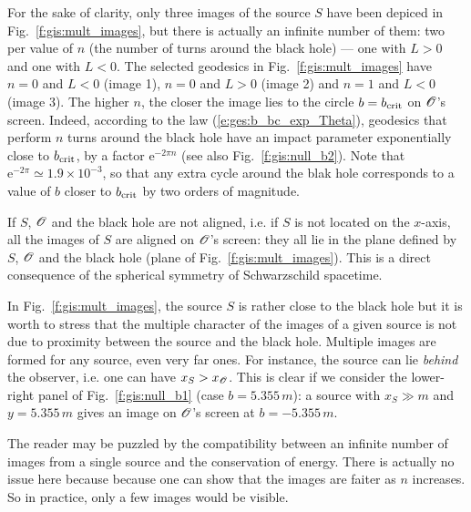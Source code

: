 For the sake of clarity, only three images of the source $S$ have been
depiced in Fig.~\ref{f:gis:mult_images}, but there is actually an infinite
number of them: two per value of $n$ (the number of turns around the black hole)
--- one with $L>0$ and one with $L<0$. The selected geodesics in
Fig.~\ref{f:gis:mult_images} have $n=0$ and $L<0$ (image 1), $n=0$ and $L>0$
(image 2) and $n=1$ and $L<0$ (image 3). The higher $n$, the closer the image
lies to the circle $b=b_{\rm crit}$ on $\mathscr{O}$'s screen. Indeed, according to the
law (\ref{e:ges:b_bc_exp_Theta}), geodesics that perform $n$ turns around the
black hole have an impact parameter exponentially close to $b_{\rm crit}$,
by a factor $\mathrm{e}^{- 2\pi n}$ (see also Fig.~\ref{f:gis:null_b2}).
Note that $\mathrm{e}^{- 2\pi}\simeq 1.9\times 10^{-3}$, so that any extra cycle
around the blak hole corresponds to a value of $b$ closer to $b_{\rm crit}$
by two orders of magnitude.


If $S$, $\mathscr{O}$ and the black hole are not aligned, i.e. if $S$ is not located
on the $x$-axis, all the images of $S$ are aligned on $\mathscr{O}$'s screen: they
all lie in the plane defined by $S$, $\mathscr{O}$ and the black hole (plane of
Fig.~\ref{f:gis:mult_images}). This is a direct consequence of the spherical
symmetry of Schwarzschild spacetime.

In Fig.~\ref{f:gis:mult_images}, the source $S$ is rather close to the
black hole but it is worth to stress that
the multiple character of the images of a given
source is not due to proximity between the source and the black hole.
Multiple images are formed for any source, even very far ones.
For instance, the source can lie \emph{behind} the
observer, i.e. one can have $x_S > x_{\mathscr{O}}$. This is clear if we consider
the lower-right panel of Fig.~\ref{f:gis:null_b1} (case $b=5.355\, m$):
a source with $x_S \gg m$ and $y=5.355\, m$ gives an image on
$\mathscr{O}$'s screen at $b=-5.355\, m$.

The reader may be puzzled by the compatibility between an infinite number
of images from a single source and the conservation of energy. There is
actually no issue here because because one can show that the images are
faiter as $n$ increases. So in practice, only a few images would be visible.


